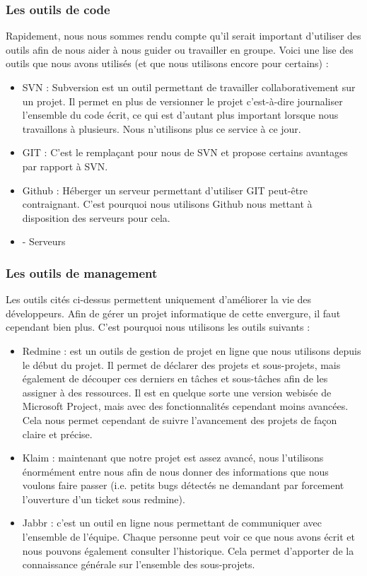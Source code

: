 \documentclass{article}
\begin{document}
\subsubsection{Les outils de code}
		Rapidement, nous nous sommes rendu compte qu'il serait important d'utiliser des outils afin de nous aider à nous guider ou travailler en groupe. Voici une lise des outils que nous avons utilisés (et que nous utilisons encore pour certains) :
		\begin{itemize}
			\item SVN : Subversion est un outil permettant de travailler collaborativement sur un projet. Il permet en plus de versionner le projet c'est-à-dire journaliser l'ensemble du code écrit, ce qui est d'autant plus important lorsque nous travaillons à plusieurs. Nous n'utilisons plus ce service à ce jour.
			\item GIT : C'est le remplaçant pour nous de SVN et propose certains avantages par rapport à SVN.
			\item Github : Héberger un serveur permettant d'utiliser GIT peut-être contraignant. C'est pourquoi nous utilisons Github nous mettant à disposition des serveurs pour cela. 
			\item - Serveurs
		\end{itemize}
		
\subsubsection{Les outils de management}
		Les outils cités ci-dessus permettent uniquement d'améliorer la vie des développeurs. Afin de gérer un projet informatique de cette envergure, il faut cependant bien plus. C'est pourquoi nous utilisons les outils suivants : 
		\begin{itemize}
			\item Redmine : est un outils de gestion de projet en ligne que nous utilisons depuis le début du projet. Il permet de déclarer des projets et sous-projets, mais également de découper ces derniers en tâches et sous-tâches afin de les assigner à des ressources. Il est en quelque sorte une version webisée de Microsoft Project, mais avec des fonctionnalités cependant moins avancées. Cela nous permet cependant de suivre l'avancement des projets de façon claire et précise.
			\item Klaim : maintenant que notre projet est assez avancé, nous l'utilisons énormément entre nous afin de nous donner des informations que nous voulons faire passer (i.e. petits bugs détectés ne demandant par forcement l'ouverture d'un ticket sous redmine).
			\item Jabbr : c'est un outil en ligne nous permettant de communiquer avec l'ensemble de l'équipe. Chaque personne peut voir ce que nous avons écrit et nous pouvons également consulter l'historique. Cela permet d'apporter de la connaissance générale sur l'ensemble des sous-projets.
		\end{itemize}
\end{document}
